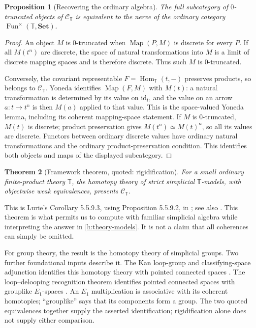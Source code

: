 \documentclass[11pt]{article}
\newtheorem{theorem}{Theorem}[section]
\newtheorem{proposition}[theorem]{Proposition}
\theoremstyle{definition}
\theoremstyle{remark}\newtheorem{remark}[theorem]{Remark}
\newcommand{\id}{\mathrm{id}}
\begin{document}
\begin{proposition}[Recovering the ordinary algebra]\label{h:discrete}
The full subcategory of $0$-truncated objects of $\mathcal C_{\mathbb T}$
is equivalent to the nerve of the ordinary category
$\operatorname{Fun}^{\times}(\mathbb T,\mathbf{Set})$.
\end{proposition}
\begin{proof}
An object $M$ is $0$-truncated when $\operatorname{Map}(P,M)$ is discrete
for every $P$.  If all $M(t^n)$ are discrete, the space of natural
transformations into $M$ is a limit of discrete mapping spaces and is
therefore discrete.  Thus such $M$ is $0$-truncated.

Conversely, the covariant representable
$F=\operatorname{Hom}_{\mathbb T}(t,-)$ preserves products, so belongs to
$\mathcal C_{\mathbb T}$.  Yoneda identifies
$\operatorname{Map}(F,M)$ with $M(t)$: a natural transformation is
determined by its value on $\id_t$, and the value on an arrow
$a:t\to t^n$ is then $M(a)$ applied to that value. This is the
space-valued Yoneda lemma, including its coherent mapping-space statement.
If $M$ is $0$-truncated, $M(t)$
is discrete; product preservation gives $M(t^n)\simeq M(t)^n$, so all its
values are discrete.  Functors between ordinary discrete values have
ordinary natural transformations and the ordinary product-preservation
condition.  This identifies both objects and maps of the displayed
subcategory.
\end{proof}

\begin{theorem}[Framework theorem, quoted: rigidification]
\label{h:rigidification}
For a small ordinary finite-product theory $\mathbb T$, the homotopy theory
of strict simplicial $\mathbb T$-models, with objectwise weak equivalences,
presents $\mathcal C_{\mathbb T}$.
\end{theorem}
This is Lurie's Corollary 5.5.9.3, using Proposition 5.5.9.2, in
\cite{HTT}; see also \cite{Badzioch}.  This theorem is what permits us
to compute with familiar simplicial algebra while interpreting the answer
in \eqref{h:theory-models}.  It is not a claim that all coherences can
simply be omitted.

For group theory, the result is the homotopy theory of simplicial groups.
Two further foundational inputs describe it. The Kan loop-group and
classifying-space adjunction identifies this homotopy theory with pointed
connected spaces \cite[Chapter V, Proposition 6.3 and Corollary 6.4]{GoerssJardine}.
The loop--delooping recognition theorem identifies pointed connected spaces
with grouplike $E_1$-spaces \cite[Theorem 5.2.6.10]{HA}.
An $E_1$ multiplication is associative with its coherent homotopies;
``grouplike'' says that its components form a group. The two quoted
equivalences together supply the asserted identification; rigidification
alone does not supply either comparison.
\end{document}
